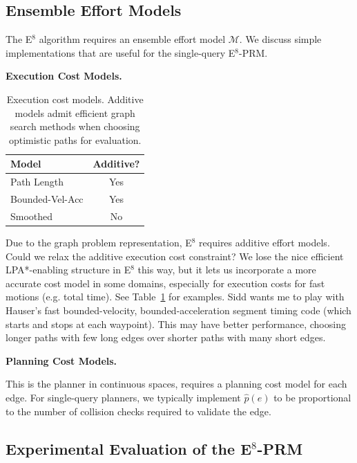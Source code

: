 \subsection{Ensemble Effort Models}

The E$^8$ algorithm requires an ensemble effort model
$\mathcal{M}$.
We discuss simple implementations that are useful
for the single-query E$^8$-PRM.

\textbf{Execution Cost Models.}

\begin{table}
   \centering
   \begin{tabular}{lc}
      \toprule
      Model & Additive? \\
      \midrule
      Path Length & Yes \\
      Bounded-Vel-Acc & Yes \\
      Smoothed & No \\
      \bottomrule
   \end{tabular}
   \caption{Execution cost models.
      Additive models admit efficient graph search methods
      when choosing optimistic paths for evaluation.}
   \label{table:exec-cost-models}
\end{table}

Due to the graph problem representation,
E$^8$ requires additive effort models.
Could we relax the additive execution cost constraint?
We lose the nice efficient LPA*-enabling structure in
E$^8$ this way,
but it lets us incorporate a more accurate cost model in some domains,
especially for execution costs for fast motions (e.g. total time).
See Table~\ref{table:exec-cost-models} for examples.
Sidd wants me to play with Hauser's fast bounded-velocity,
bounded-acceleration segment timing code
(which starts and stops at each waypoint).
This may have better performance,
choosing longer paths with few long edges over
shorter paths with many short edges.

\textbf{Planning Cost Models.}

This is the planner in continuous spaces,
requires a planning cost model for each edge.
For single-query planners,
we typically implement $\hat{p}(e)$ to be
proportional to the number of collision checks required
to validate the edge.

\subsection{Experimental Evaluation of the E$^8$-PRM}
\label{subsec:single-query-results}

